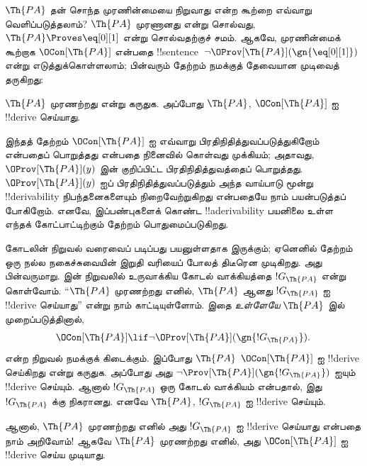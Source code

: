 \documentclass[../../../include/open-logic-section]{subfiles}
\begin{document}



$\Th{PA}$ தன் சொந்த முரணின்மையை நிறுவாது என்ற கூற்றை எவ்வாறு
வெளிப்படுத்தலாம்? $\Th{PA}$ முரணானது என்று சொல்வது,
$\Th{PA} \Proves \eq[0][1]$ என்று சொல்வதற்குச் சமம். ஆகவே,
முரணின்மைக் கூற்றாக $\OCon[\Th{PA}]$ என்பதை
!!{sentence}~$\lnot \OProv[\Th{PA}](\gn{\eq[0][1]})$ என்று
எடுத்துக்கொள்ளலாம்; பின்வரும் தேற்றம் நமக்குத் தேவையான முடிவைத் தருகிறது:

\begin{thm}
$\Th{PA}$ முரணற்றது என்று கருதுக. அப்போது $\Th{PA}$,
$\OCon[\Th{PA}]$ ஐ !!{derive} செய்யாது.
\end{thm}

இந்தத் தேற்றம் $\OCon[\Th{PA}]$ ஐ எவ்வாறு பிரதிநிதித்துவப்படுத்துகிறோம்
என்பதைப் பொறுத்தது என்பதை நினைவில் கொள்வது முக்கியம்; அதாவது,
$\OProv[\Th{PA}](y)$ இன் குறிப்பிட்ட பிரதிநிதித்துவத்தைப் பொறுத்தது.
$\OProv[\Th{PA}](y)$ ஐப் பிரதிநிதித்துவப்படுத்தும் அந்த வாய்பாடு மூன்று
!!{derivability} நிபந்தனைகளையும் நிறைவேற்றுகிறது என்பதையே நாம்
பயன்படுத்தப் போகிறோம். எனவே, இப்பண்புகளைக் கொண்ட
!!a{derivability} பயனிலை உள்ள எந்தக் கோட்பாட்டிற்கும் தேற்றம்
பொதுமைப்படுகிறது.

கோடலின் நிறுவல் வரைவைப் படிப்பது பயனுள்ளதாக இருக்கும்; ஏனெனில்
தேற்றம் ஒரு நல்ல நகைச்சுவையின் இறுதி வரியைப் போலத் திடீரென முடிகிறது.
அது பின்வருமாறு.  இன் நிறுவலில்
உருவாக்கிய கோடல் வாக்கியத்தை
$!G_\Th{PA}$ என்று கொள்வோம். “$\Th{PA}$ முரணற்றது எனில்,
$\Th{PA}$ ஆனது $!G_\Th{PA}$ ஐ !!{derive} செய்யாது” என்று நாம்
காட்டியுள்ளோம். இதை \emph{உள்ளேயே} $\Th{PA}$ இல் முறைப்படுத்தினால்,
\[
\OCon[\Th{PA}] \lif \lnot \OProv[\Th{PA}](\gn{!G_\Th{PA}}).
\]
என்ற நிறுவல் நமக்குக் கிடைக்கும். இப்போது $\Th{PA}$
$\OCon[\Th{PA}]$ ஐ !!{derive} செய்கிறது என்று கருதுக. அப்போது அது
$\lnot \Prov[\Th{PA}](\gn{!G_\Th{PA}})$ ஐயும் !!{derive} செய்யும்.
ஆனால் $!G_\Th{PA}$ ஒரு கோடல் வாக்கியம் என்பதால், இது
$!G_\Th{PA}$ க்கு நிகரானது. எனவே $\Th{PA}$,
$!G_\Th{PA}$ ஐ !!{derive} செய்யும்.

ஆனால், $\Th{PA}$ முரணற்றது எனில் அது $!G_\Th{PA}$ ஐ !!{derive}
செய்யாது என்பதை நாம் அறிவோம்! ஆகவே $\Th{PA}$ முரணற்றது எனில்,
அது $\OCon[\Th{PA}]$ ஐ !!{derive} செய்ய முடியாது.
\end{document}

